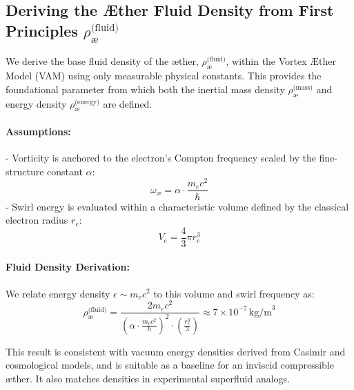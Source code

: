 \documentclass[12pt]{article}
\begin{document}
            \subsection{Deriving the Æther Fluid Density from First Principles \boldmath\( \rho_{\text{\ae}}^{\text{(fluid)}} \)}
                \label{sec:aether_fluid_density}
        
                We derive the base fluid density of the æther, \textbf{\boldmath\( \rho_{\text{\ae}}^{\text{(fluid)}} \)}, within the Vortex \AE{}ther Model (VAM) using only measurable physical constants. This provides the foundational parameter from which both the inertial mass density \textbf{\boldmath\( \rho_{\text{\ae}}^{\text{(mass)}} \)} and energy density \textbf{\boldmath\( \rho_{\text{\ae}}^{\text{(energy)}} \)} are defined.
        
                \paragraph{Assumptions:}
                - Vorticity is anchored to the electron’s Compton frequency scaled by the fine-structure constant \( \alpha \):
                \[
                \omega_{\text{\ae}} = \alpha \cdot \frac{m_e c^2}{\hbar}
                \]
                - Swirl energy is evaluated within a characteristic volume defined by the classical electron radius \( r_e \):
                \[
                V_e = \frac{4}{3} \pi r_e^3
                \]
        
                \paragraph{Fluid Density Derivation:}
                We relate energy density \( \epsilon \sim m_e c^2 \) to this volume and swirl frequency as:
                \[
                \rho_{\text{\ae}}^{\text{(fluid)}} = \frac{2 m_e c^2}{\left( \alpha \cdot \frac{m_e c^2}{\hbar} \right)^2 \cdot \left( \frac{r_e^3}{3} \right)} \approx 7 \times 10^{-7} \, \text{kg/m}^3
                \]
        
                This result is consistent with vacuum energy densities derived from Casimir and cosmological models, and is suitable as a baseline for an inviscid compressible æther. It also matches densities in experimental superfluid analogs.
        
\end{document}
